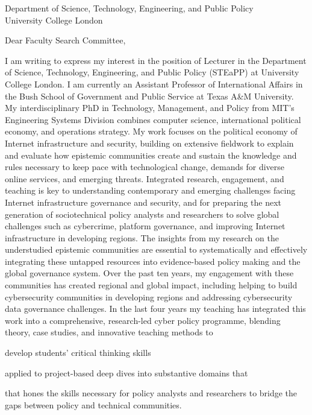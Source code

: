 \documentclass[11pt]{letter}
\begin{document}
\begin{letter}
{
  Department of Science, Technology, Engineering, and Public Policy \\ 
  University College London
}

\opening{Dear Faculty Search Committee,}

I am writing to express my interest in the position of Lecturer in the Department of Science, Technology, Engineering, and Public Policy (STEaPP) at University College London.  
%
I am currently an Assistant Professor of International Affairs in the Bush School of Government and Public Service at Texas A\&M University.  
%
My interdisciplinary PhD in Technology, Management, and Policy from MIT's Engineering Systems Division combines computer science, international political economy, and operations strategy.
%
My work focuses on the political economy of Internet infrastructure and security, building on extensive fieldwork to explain and evaluate how epistemic communities create and sustain the knowledge and rules necessary to keep pace with technological change, demands for diverse online services, and emerging threats.
%
Integrated research, engagement, and teaching is key to understanding contemporary and emerging challenges facing Internet infrastructure governance and security, and for preparing the next generation of sociotechnical policy analysts and researchers to solve global challenges such as cybercrime, platform governance, and improving Internet infrastructure in developing regions.  
%
%
The insights from my research on the understudied epistemic communities are essential to systematically and effectively integrating these untapped resources into evidence-based policy making and the global governance system.
%
Over the past ten years, my engagement with these communities has created  regional and global impact, including helping to build cybersecurity communities in developing regions and addressing cybersecurity data governance challenges.
%
In the last four years my teaching has integrated this work into a comprehensive, research-led cyber policy programme, blending theory, case studies, and innovative teaching methods to %
\begin{inparaenum}
  \item develop students' critical thinking skills 
  \item applied to project-based deep dives into substantive domains that
  \item that hones the skills necessary for policy analysts and researchers to bridge the gaps between policy and technical communities.
\end{inparaenum}
%


\end{letter}
\end{document}
